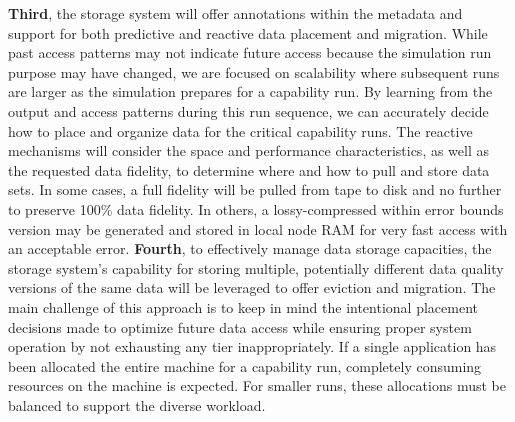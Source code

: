 \documentclass[11pt,letterpaper]{article}
\begin{document}
%
\textbf{Third}, the storage system will offer annotations within the metadata
and support for both predictive and reactive data placement and migration.
While past access patterns may not indicate future access because the
simulation run purpose may have changed, we are focused on scalability where
subsequent runs are larger as the simulation prepares for a capability run.  By
learning from the output and access patterns during this run sequence, we can
accurately decide how to place and organize data for the critical capability
runs. The reactive mechanisms will consider the space and performance
characteristics, as well as the requested data fidelity, to determine where and
how to pull and store data sets. In some cases, a full fidelity will be pulled
from tape to disk and no further to preserve 100\% data fidelity. In others, a
lossy-compressed within error bounds version may be generated and stored in
local node RAM for very fast access with an acceptable error.
%
\textbf{Fourth}, to effectively manage data storage capacities, the storage
system's capability for storing multiple, potentially different data quality
versions of the same data will be leveraged to offer eviction and migration. The main challenge of this approach is to keep in mind the intentional placement
decisions made to optimize future data access while ensuring proper system
operation by not exhausting any tier inappropriately. If a single application
has been allocated the entire machine for a capability run, completely
consuming resources on the machine is expected. For smaller runs, these
allocations must be balanced to support the diverse workload.
\end{document}
